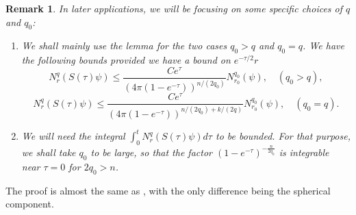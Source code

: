 \documentclass[11pt]{amsart}
\numberwithin{equation}{section}
\newtheorem{remark}[theorem]{Remark}
\numberwithin{equation}{section}
\begin{document}
	\begin{remark}\label{RkVelaz}
		In later applications, we will be focusing on some specific choices of $q$ and $q_0$:
		\begin{enumerate}
			\item  We shall mainly use the lemma for the two cases $q_0 > q$ and $q_0=q$. We have the following  bounds   provided we have a bound on $e^{-\tau/2}r$
			$$N^q_r(S(\tau)\psi)\leq 
			\frac{ C e^{\tau}}{(4\pi(1-e^{-\tau}))^{n/(2q_0)}} N^{q_0}_{r_0}(\psi), \quad (q_0>q),$$
			$$N^q_r(S(\tau)\psi)\leq 
			\frac{ C e^{\tau}}{(4\pi(1-e^{-\tau}))^{n/(2q_0)+k/(2q)}} N^{q_0}_{r_0}(\psi), \quad (q_0=q).$$
			\item We will need the integral $\int_0^t N^q_r(S(\tau)\psi)d\tau$ to be bounded. For that purpose, we shall take $q_0$ to be large, so that the factor $(1-e^{-\tau})^{-\frac{n}{2q_0}}$ is integrable near $\tau=0$ for $2q_0>n$. 
		\end{enumerate}
	\end{remark}
	
	
	The proof is almost the same as \cite{V1}, with the only difference being the spherical component. 
	
\end{document}
